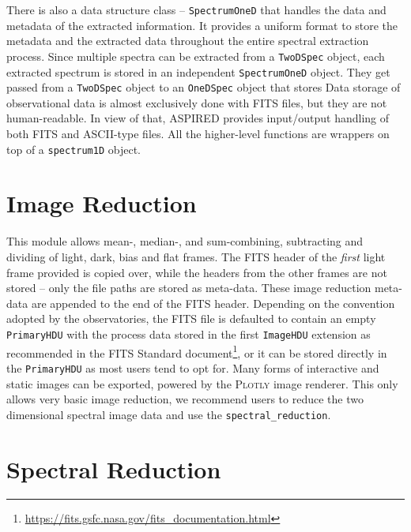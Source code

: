 \documentclass[linenumbers, twocolumn]{aastex631}
\begin{document}
There is also a data structure class -- \texttt{SpectrumOneD} that handles the
data and metadata of the extracted information. It provides a uniform format
to store the metadata and the extracted data throughout the entire spectral
extraction process. Since multiple spectra can be extracted from a
\texttt{TwoDSpec} object, each extracted spectrum is stored in an independent
\texttt{SpectrumOneD} object. They get passed from a \texttt{TwoDSpec} object
to an \texttt{OneDSpec} object that stores Data storage of observational data is
almost exclusively done with FITS files, but they are not human-readable. In
view of that, \textsc{ASPIRED} provides input/output handling of both FITS and
ASCII-type files. All the higher-level functions are wrappers on top of a
\texttt{spectrum1D} object.

\section{Image Reduction}
\label{sec:image_reduction}
This module allows mean-, median-, and sum-combining, subtracting and dividing
of light, dark, bias and flat frames. The FITS header of the \textit{first}
light frame provided is copied over, while the headers from the other frames
are not stored -- only the file paths are stored as meta-data. These image
reduction meta-data are appended to the end of the FITS header. Depending on
the convention adopted by the observatories, the FITS file is defaulted to
contain an empty \texttt{PrimaryHDU} with the process data stored in the
first \texttt{ImageHDU} extension as recommended in the FITS Standard 
document\footnote{\url{https://fits.gsfc.nasa.gov/fits_documentation.html}},
or it can be stored directly in the \texttt{PrimaryHDU} as most users tend
to opt for. Many forms of interactive and static images can be exported,
powered by the \textsc{Plotly} image renderer. This only allows very basic
image reduction, we recommend users to reduce the two dimensional spectral
image data and use the \texttt{spectral\_reduction}.

\section{Spectral Reduction}
\label{sec:spectral_reduction}
\end{document}
